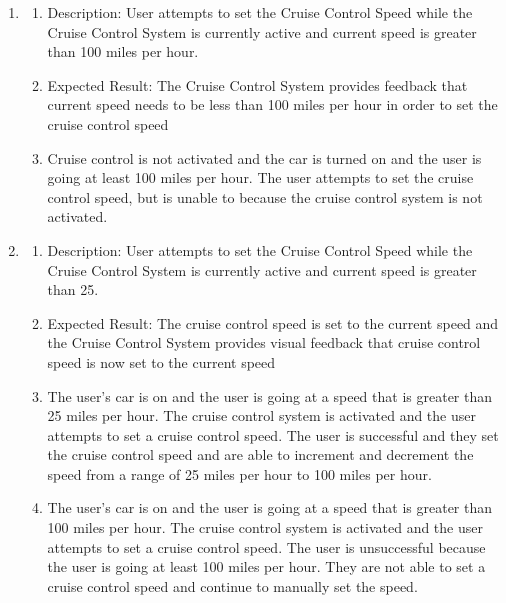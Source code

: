 \documentclass[preprint,11pt,3p]{article}
\begin{document}
\begin{enumerate}
	\item 
		\begin{enumerate}
	\item Description: User attempts to set the Cruise Control Speed while the Cruise Control System is currently active and current speed is greater than 100 miles per hour.
	\item Expected Result: The Cruise Control System provides feedback that current speed needs to be less than 100 miles per hour in order to set the cruise control speed
	\item Cruise control is not activated and the car is turned on and the user is going at least 100 miles per hour. The user attempts to set the cruise control speed, but is unable to because the cruise control system is not activated. 
\end{enumerate}

	\item 
		\begin{enumerate}
	\item Description: User attempts to set the Cruise Control Speed while the Cruise Control System is currently active and current speed is greater than 25.
	\item Expected Result: The cruise control speed is set to the current speed and the Cruise Control System provides visual feedback that cruise control speed is now set to the current speed
	\item The user’s car is on and the user is going at a speed that is greater than 25 miles per hour. The cruise control system is activated and the user attempts to set a cruise control speed. The user is successful and they set the cruise control speed and are able to increment and decrement the speed from a range of 25 miles per hour to 100 miles per hour. 
	\item The user’s car is on and the user is going at a speed that is greater than 100 miles per hour. The cruise control system is activated and the user attempts to set a cruise control speed. The user is unsuccessful because the user is going at least 100 miles per hour. They are not able to set a cruise control speed and continue to manually set the speed. 
\end{enumerate}


\end{enumerate}
\end{document}
